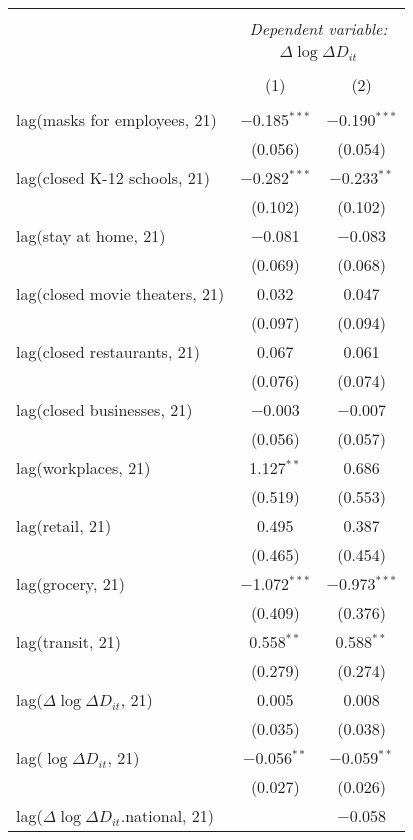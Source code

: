 \begin{tabular}{@{\extracolsep{1pt}}lcc} 
\\[-1.8ex]\hline 
\hline \\[-1.8ex] 
 & \multicolumn{2}{c}{\textit{Dependent variable:}} \\ 
\cline{2-3} 
 & \multicolumn{2}{c}{$\Delta \log \Delta D_{it}$} \\ 
\\[-1.8ex] & (1) & (2)\\ 
\hline \\[-1.8ex] 
 lag(masks for employees, 21) & $-$0.185$^{***}$ & $-$0.190$^{***}$ \\ 
  & (0.056) & (0.054) \\ 
  lag(closed K-12 schools, 21) & $-$0.282$^{***}$ & $-$0.233$^{**}$ \\ 
  & (0.102) & (0.102) \\ 
  lag(stay at home, 21) & $-$0.081 & $-$0.083 \\ 
  & (0.069) & (0.068) \\ 
  lag(closed movie theaters, 21) & 0.032 & 0.047 \\ 
  & (0.097) & (0.094) \\ 
  lag(closed restaurants, 21) & 0.067 & 0.061 \\ 
  & (0.076) & (0.074) \\ 
  lag(closed businesses, 21) & $-$0.003 & $-$0.007 \\ 
  & (0.056) & (0.057) \\ 
  lag(workplaces, 21) & 1.127$^{**}$ & 0.686 \\ 
  & (0.519) & (0.553) \\ 
  lag(retail, 21) & 0.495 & 0.387 \\ 
  & (0.465) & (0.454) \\ 
  lag(grocery, 21) & $-$1.072$^{***}$ & $-$0.973$^{***}$ \\ 
  & (0.409) & (0.376) \\ 
  lag(transit, 21) & 0.558$^{**}$ & 0.588$^{**}$ \\ 
  & (0.279) & (0.274) \\ 
  lag($\Delta \log \Delta D_{it}$, 21) & 0.005 & 0.008 \\ 
  & (0.035) & (0.038) \\ 
  lag($\log \Delta D_{it}$, 21) & $-$0.056$^{**}$ & $-$0.059$^{**}$ \\ 
  & (0.027) & (0.026) \\ 
  lag($\Delta \log \Delta D_{it}$.national, 21) &  & $-$0.058 \\ 

\end{tabular}
